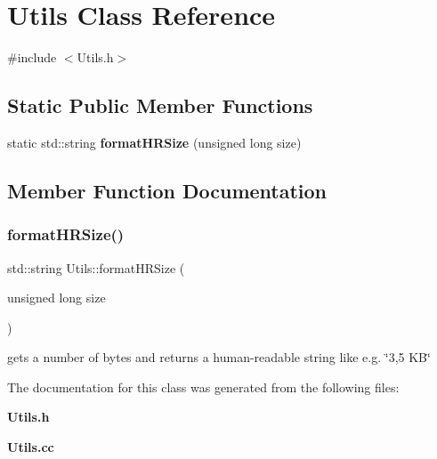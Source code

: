 \section{Utils Class Reference}
\label{classUtils}


{\ttfamily \#include $<$Utils.\+h$>$}

\subsection*{Static Public Member Functions}
\begin{DoxyCompactItemize}
\item 
static std\+::string \textbf{ format\+H\+R\+Size} (unsigned long size)
\end{DoxyCompactItemize}


\subsection{Member Function Documentation}
\mbox{\label{classUtils_a6756cc482783b7b1c236124b8d52da29}} 
\subsubsection{format\+H\+R\+Size()}
{\footnotesize\ttfamily std\+::string Utils\+::format\+H\+R\+Size (\begin{DoxyParamCaption}\item[{unsigned long}]{size }\end{DoxyParamCaption})\hspace{0.3cm}{\ttfamily [static]}}

gets a number of bytes and returns a human-\/readable string like e.\+g. \char`\"{}3,5 K\+B\char`\"{} 

The documentation for this class was generated from the following files\+:\begin{DoxyCompactItemize}
\item 
\textbf{ Utils.\+h}\item 
\textbf{ Utils.\+cc}\end{DoxyCompactItemize}
